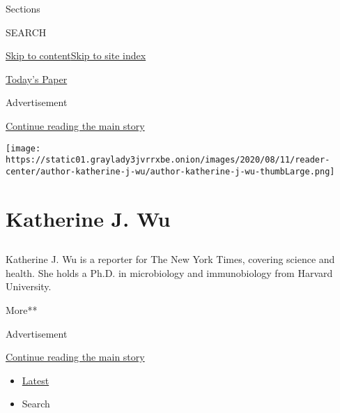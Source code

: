 Sections

SEARCH

\protect\hyperlink{site-content}{Skip to
content}\protect\hyperlink{site-index}{Skip to site index}

\href{https://myaccount.nytimes3xbfgragh.onion/auth/login?response_type=cookie\&client_id=vi}{}

\href{https://www.nytimes3xbfgragh.onion/section/todayspaper}{Today's
Paper}

Advertisement

\protect\hyperlink{after-top}{Continue reading the main story}

\texttt{[image: https://static01.graylady3jvrrxbe.onion/images/2020/08/11/reader-center/author-katherine-j-wu/author-katherine-j-wu-thumbLarge.png]}

\hypertarget{katherine-j-wu}{%
\section{Katherine J. Wu}\label{katherine-j-wu}}

\subsection{}

Katherine J. Wu is a reporter for The New York Times, covering science
and health. She holds a Ph.D. in microbiology and immunobiology from
Harvard University.

More**

Advertisement

\protect\hyperlink{after-mid1}{Continue reading the main story}

\begin{itemize}
\tightlist
\item
  \protect\hyperlink{stream-panel}{Latest}
\item
  Search
\end{itemize}

